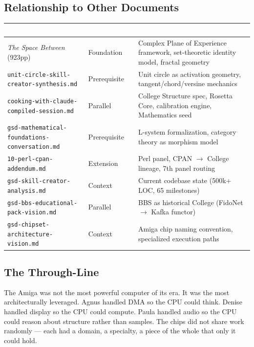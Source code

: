 \documentclass[11pt,letterpaper]{article}
\newcommand{\tableheader}[1]{\textbf{\sffamily\textcolor{white}{#1}}}
\begin{document}
\subsection{Relationship to Other Documents}

\begin{center}
\begin{tabularx}{\textwidth}{L{4.5cm}L{2.2cm}X}
\toprule
{}
\tableheader{Document} & \tableheader{Relationship} & \tableheader{What It Contributes} \\
\midrule
\textit{The Space Between} (923pp) & Foundation & Complex Plane of Experience framework, set-theoretic identity model, fractal geometry \\
\texttt{unit-circle-skill-creator-synthesis.md} & Prerequisite & Unit circle as activation geometry, tangent/chord/versine mechanics \\
\texttt{cooking-with-claude-compiled-session.md} & Parallel & College Structure spec, Rosetta Core, calibration engine, Mathematics seed \\
\texttt{gsd-mathematical-foundations-conversation.md} & Prerequisite & L-system formalization, category theory as morphism model \\
\texttt{10-perl-cpan-addendum.md} & Extension & Perl panel, CPAN $\to$ College lineage, 7th panel routing \\
\texttt{gsd-skill-creator-analysis.md} & Context & Current codebase state (500k+ LOC, 65 milestones) \\
\texttt{gsd-bbs-educational-pack-vision.md} & Parallel & BBS as historical College (FidoNet $\to$ Kafka functor) \\
\texttt{gsd-chipset-architecture-vision.md} & Context & Amiga chip naming convention, specialized execution paths \\
\bottomrule
\end{tabularx}
\end{center}

\subsection{The Through-Line}

The Amiga was not the most powerful computer of its era. It was the most architecturally leveraged.
Agnus handled DMA so the CPU could think. Denise handled display so the CPU could compute. Paula
handled audio so the CPU could reason about structure rather than samples. The chips did not share
work randomly --- each had a domain, a specialty, a piece of the whole that only it could hold.
\end{document}
